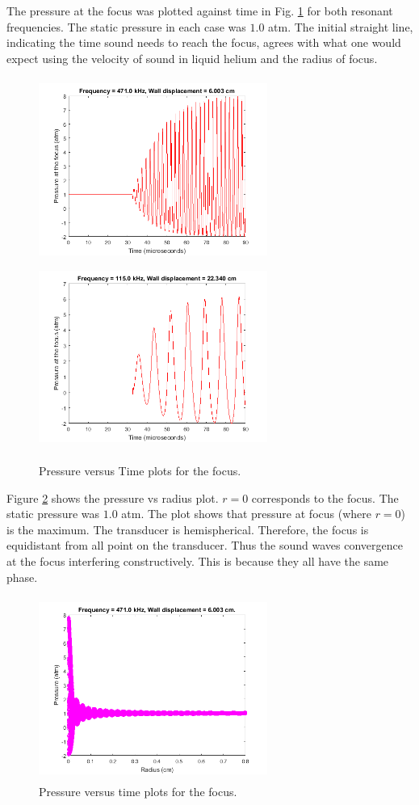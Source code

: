 The pressure at the focus was plotted against time in Fig. \ref{presvstime} for both resonant frequencies. The static pressure in each case was $1.0$ atm. The initial straight line, indicating the time sound needs to reach the focus, agrees with what one would expect using the velocity of sound in liquid helium and the radius of focus.
\begin{figure}[H]
\includegraphics[width=75mm, height=60mm]{Nonlinear_correction/pvt_hf.png}
\includegraphics[width=75mm, height=60mm]{Nonlinear_correction/pvt_lf.png}
\caption{Pressure versus Time plots for the focus.}
\label{presvstime}
\end{figure}
Figure \ref{presvsrad} shows the pressure vs radius plot. $r=0$ corresponds to the focus. The static pressure was $1.0$ atm. The plot shows that pressure at focus (where $r=0$) is the maximum. The transducer is hemispherical. Therefore, the focus is equidistant from all point on the transducer. Thus the sound waves convergence at the focus interfering constructively. This is because they all have the same phase.
\begin{figure}[H]
\centering 
\includegraphics[width=75mm, height=60mm]{Nonlinear_correction/prevsrad.png}
\caption{Pressure versus time plots for the focus.}
\label{presvsrad}
\end{figure}

